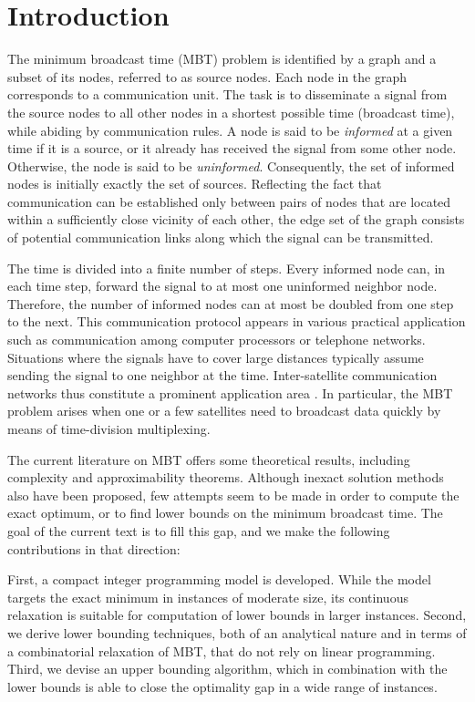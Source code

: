 \section{Introduction}
\label{intro}
The minimum broadcast time (MBT) problem is identified by a graph and a subset of its nodes,
referred to as source nodes.
Each node in the graph corresponds to a communication unit.
The task is to disseminate a signal from the source nodes to all other nodes in a shortest possible time (broadcast time), while abiding by communication rules.
A node is said to be \emph{informed} at a given time if it is a source, or it already has received the signal from some other node.
Otherwise, the node is said to be \emph{uninformed}.
Consequently, the set of informed nodes is initially exactly the set of sources.
Reflecting the fact that communication can be established only between pairs of nodes that are located within a sufficiently close vicinity of each other,
the edge set of the graph consists of potential communication links along which the signal can be transmitted.

The time is divided into a finite number of steps.
Every informed node can, in each time step, forward the signal to at most one uninformed neighbor node.
Therefore, the number of informed nodes can at most be doubled from one step to the next.
This communication protocol appears in various practical application such as communication among computer processors or telephone networks.
Situations where the signals have to cover large distances typically assume sending the signal to one neighbor at the time.
Inter-satellite communication networks thus constitute a prominent application area \cite{chu17}.
In particular, the MBT problem arises when one or a few satellites need to broadcast data quickly by means of time-division multiplexing.

The current literature on MBT offers some theoretical results, including complexity and approximability theorems.
Although inexact solution methods also have been proposed, few attempts seem to be made in order to compute the exact optimum,
or to find lower bounds on the minimum broadcast time.
The goal of the current text is to fill this gap, and we make the following contributions in that direction:

First, a compact integer programming model is developed.
While the model targets the exact minimum in instances of moderate size, its continuous relaxation is suitable for computation of lower bounds in larger instances.
Second, we derive lower bounding techniques, both of an analytical nature and in terms of a combinatorial relaxation of MBT,
that do not rely on linear programming.
Third, we devise an upper bounding algorithm, which in combination with the lower bounds is able to close the optimality gap in a wide range of instances.

